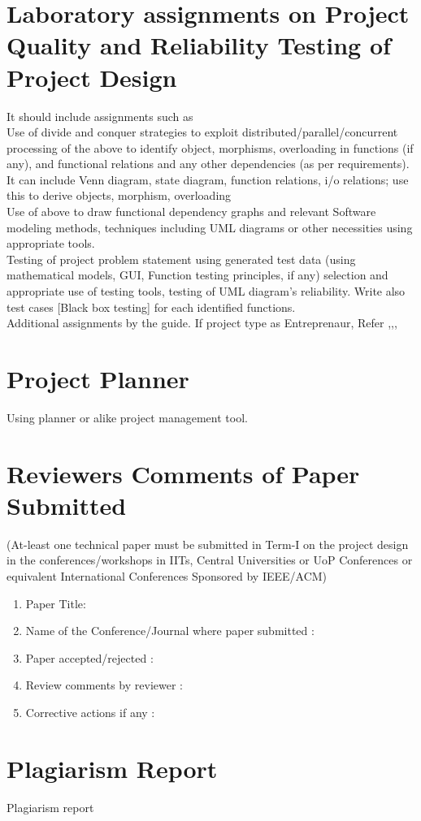 \documentclass[oneside,a4paper,12pt]{report}
\begin{document}
\begin{appendices}
\chapter{Laboratory assignments on Project Quality and Reliability Testing of Project Design}

It should include assignments such as\\
 Use of divide and conquer strategies to exploit distributed/parallel/concurrent processing of the above to identify object, morphisms, overloading in functions (if any), and functional relations and any other dependencies (as per requirements).\\
             It can include Venn diagram, state diagram, function relations, i/o relations; use this to derive objects, morphism, overloading\\

 Use of above to draw functional dependency graphs and relevant Software modeling methods, techniques including UML diagrams or other necessities using appropriate tools.
 \\
Testing of project problem statement using generated test data (using mathematical models, GUI, Function testing principles, if any) selection and appropriate use of testing tools, testing of UML diagram's reliability. Write also test cases [Black box testing] for each identified functions. \\
 Additional assignments by the guide. If project type as Entreprenaur, Refer \cite{ehr},\cite{mckinsey},\cite{mckinseyweb}, \cite{govwebsite}


\chapter{Project Planner}
\label{app:plan}
Using planner or alike project management tool.




\chapter{Reviewers Comments of Paper Submitted}
(At-least one technical paper must be submitted in Term-I on the project design in the
conferences/workshops in IITs, Central Universities or UoP Conferences or equivalent International Conferences Sponsored by IEEE/ACM)
\begin{enumerate}
\item Paper Title:
\item Name of the Conference/Journal where paper submitted :
\item Paper accepted/rejected : 
\item Review comments by reviewer :
\item Corrective actions if any :  

\end{enumerate}

\chapter{Plagiarism Report}
Plagiarism report


\end{appendices}
\end{document}
